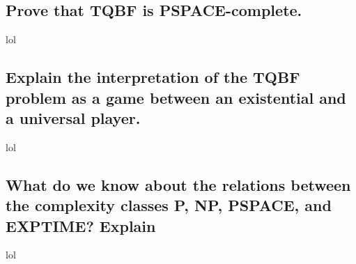 \subsection{Prove that TQBF is PSPACE-complete.}
lol

\subsection{Explain the interpretation of the TQBF problem as a game between an existential and a universal player.}
lol

\subsection{What do we know about the relations between the complexity classes P, NP, PSPACE, and EXPTIME? Explain}
lol


